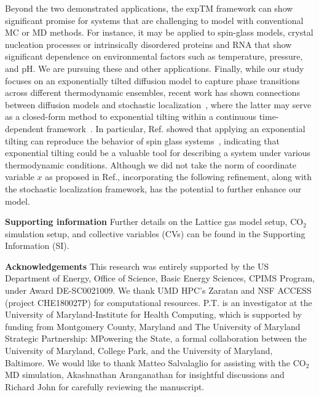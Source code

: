 \documentclass[aip,jcp,reprint,longbibliography]{revtex4-1}
\begin{document}
Beyond the two demonstrated applications, the expTM framework can show significant promise for systems that are challenging to model with conventional MC or MD methods. For instance, it may be applied to spin-glass models, crystal nucleation processes or intrinsically disordered proteins and RNA that show significant dependence on environmental factors such as temperature, pressure, and pH. We are pursuing these and other applications. Finally, while our study focuses on an exponentially tilted diffusion model to capture phase transitions across different thermodynamic ensembles, recent work has shown connections between diffusion models and stochastic localization~\cite{montanari2023sampling}, where the latter may serve as a closed-form method to exponential tilting within a continuous time-dependent framework~\cite{albergo2023stochastic}. In particular, Ref. showed that applying an exponential tilting can reproduce the behavior of spin glass systems~\cite{Edwards1975Theory}, indicating that exponential tilting could be a valuable tool for describing a system under various thermodynamic conditions. Although we did not take the norm of coordinate variable $x$ as proposed in Ref., incorporating the following refinement, along with the stochastic localization framework, has the potential to further enhance our model.   \newline

\textbf{Supporting information\newline }
Further details on the Lattice gas model setup, CO$_2$ simulation setup, and collective variables (CVs) can be found in the Supporting Information (SI). 
\newline

\textbf{Acknowledgements\newline }
This research was entirely supported by the US
Department of Energy, Office of Science, Basic
Energy Sciences, CPIMS Program, under Award
DE-SC0021009. We thank UMD HPC’s Zaratan and NSF ACCESS (project CHE180027P) for computational resources. P.T. is an investigator at the University of Maryland-Institute for Health Computing, which is supported by funding from Montgomery County, Maryland and The University of Maryland Strategic Partnership: MPowering the State, a formal collaboration between the University of Maryland, College Park, and the University of Maryland, Baltimore. We would like to thank Matteo Salvalaglio for assisting with the CO$_2$ MD simulation, Akashnathan Aranganathan for insightful discussions and Richard John for carefully reviewing the manuscript. 
 \newline
\end{document}

